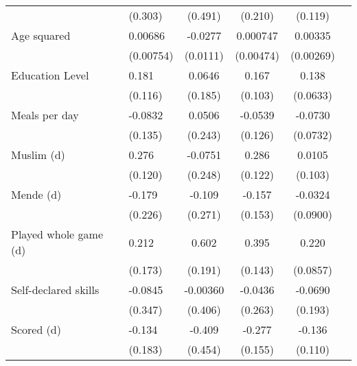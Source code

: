{\begin{tabularx}{\textwidth}{Xl*{4}{c}}
                    &     (0.303)         &     (0.491)         &     (0.210)         &     (0.119)         \\
[0.5em]
Age squared         &     0.00686         &     -0.0277\sym{**} &    0.000747         &     0.00335         \\
                    &   (0.00754)         &    (0.0111)         &   (0.00474)         &   (0.00269)         \\
[0.5em]
Education Level     &       0.181         &      0.0646         &       0.167         &       0.138\sym{**} \\
                    &     (0.116)         &     (0.185)         &     (0.103)         &    (0.0633)         \\
[0.5em]
Meals per day       &     -0.0832         &      0.0506         &     -0.0539         &     -0.0730         \\
                    &     (0.135)         &     (0.243)         &     (0.126)         &    (0.0732)         \\
[0.5em]
Muslim (d)          &       0.276\sym{**} &     -0.0751         &       0.286\sym{**} &      0.0105         \\
                    &     (0.120)         &     (0.248)         &     (0.122)         &     (0.103)         \\
[0.5em]
Mende (d)           &      -0.179         &      -0.109         &      -0.157         &     -0.0324         \\
                    &     (0.226)         &     (0.271)         &     (0.153)         &    (0.0900)         \\
[0.5em]
Played whole game (d)&       0.212         &       0.602\sym{***}&       0.395\sym{***}&       0.220\sym{**} \\
                    &     (0.173)         &     (0.191)         &     (0.143)         &    (0.0857)         \\
[0.5em]
Self-declared skills&     -0.0845         &    -0.00360         &     -0.0436         &     -0.0690         \\
                    &     (0.347)         &     (0.406)         &     (0.263)         &     (0.193)         \\
[0.5em]
Scored (d)          &      -0.134         &      -0.409         &      -0.277\sym{*}  &      -0.136         \\
                    &     (0.183)         &     (0.454)         &     (0.155)         &     (0.110)         \\

\end{tabularx}}
